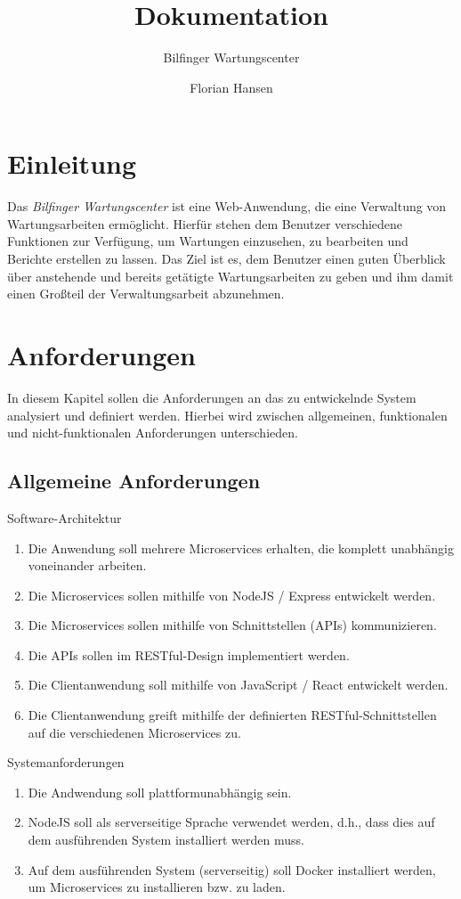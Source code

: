 \documentclass[12pt]{scrreprt}
\title{Dokumentation}
\subtitle{Bilfinger Wartungscenter}
\author{Florian Hansen}
\newcommand{\itemh}[1]{{\bfseries\large\item #1}}
\begin{document}
  \maketitle

  \chapter{Einleitung}
  Das \textit{Bilfinger Wartungscenter} ist eine Web-Anwendung, die eine Verwaltung von Wartungsarbeiten ermöglicht.
  Hierfür stehen dem Benutzer verschiedene Funktionen zur Verfügung, um Wartungen einzusehen, zu bearbeiten und
  Berichte erstellen zu lassen. Das Ziel ist es, dem Benutzer einen guten Überblick über anstehende und bereits
  getätigte Wartungsarbeiten zu geben und ihm damit einen Großteil der Verwaltungsarbeit abzunehmen.

  \chapter{Anforderungen}
  In diesem Kapitel sollen die Anforderungen an das zu entwickelnde System analysiert und definiert werden. Hierbei wird
  zwischen allgemeinen, funktionalen und nicht-funktionalen Anforderungen unterschieden.

  \section{Allgemeine Anforderungen}
  \begin{enumerate}
    \itemh{Software-Architektur}
    \begin{enumerate}
      \item Die Anwendung soll mehrere Microservices erhalten, die komplett unabhängig voneinander arbeiten.
      \item Die Microservices sollen mithilfe von NodeJS / Express entwickelt werden.
      \item Die Microservices sollen mithilfe von Schnittstellen (APIs) kommunizieren.
      \item Die APIs sollen im RESTful-Design implementiert werden.
      \item Die Clientanwendung soll mithilfe von JavaScript / React entwickelt werden.
      \item Die Clientanwendung greift mithilfe der definierten RESTful-Schnittstellen auf die verschiedenen
        Microservices zu.
    \end{enumerate}

    \itemh{Systemanforderungen}
    \begin{enumerate}
      \item Die Andwendung soll plattformunabhängig sein.
      \item NodeJS soll als serverseitige Sprache verwendet werden, d.h., dass dies auf dem ausführenden System
        installiert werden muss.
      \item Auf dem ausführenden System (serverseitig) soll Docker installiert werden, um Microservices zu installieren bzw. zu laden.
    \end{enumerate}
  \end{enumerate}
\end{document}
